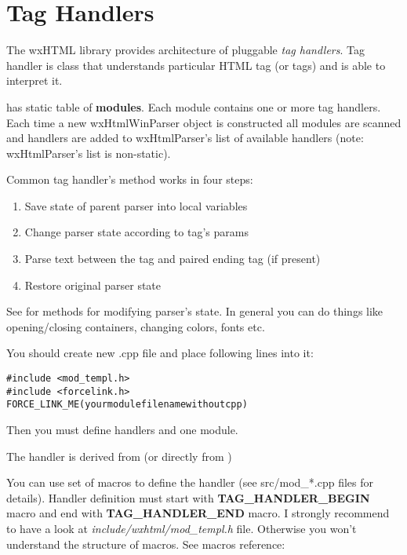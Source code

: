 \section{Tag Handlers}\label{handlers}

The wxHTML library provides architecture of pluggable {\it tag handlers}.
Tag handler is class that understands particular HTML tag (or tags) and is
able to interpret it.

 has static table of {\bf modules}.
Each module contains one or more tag handlers. Each time a new wxHtmlWinParser
object is constructed all modules are scanned and handlers are added
to wxHtmlParser's list of available handlers (note: wxHtmlParser's list
is non-static).


Common tag handler's  method
works in four steps:

\begin{enumerate}\itemsep=0pt
\item Save state of parent parser into local variables
\item Change parser state according to tag's params
\item Parse text between the tag and paired ending tag (if present)
\item Restore original parser state
\end{enumerate}

See  for methods for modifying
parser's state. In general you can do things like opening/closing containers,
changing colors, fonts etc.


You should create new .cpp file and place following lines into it: 

\begin{verbatim}
#include <mod_templ.h>
#include <forcelink.h>
FORCE_LINK_ME(yourmodulefilenamewithoutcpp)
\end{verbatim}

Then you must define handlers and one module.


The handler is derived from 
(or directly from )

You can use set of macros to define the handler (see src/mod\_*.cpp files
for details). Handler definition must start with {\bf TAG\_HANDLER\_BEGIN} macro
and end with {\bf TAG\_HANDLER\_END} macro. I strongly recommend to have a look
at {\it include/wxhtml/mod\_templ.h} file. Otherwise you won't understand
the structure of macros. See macros reference:

